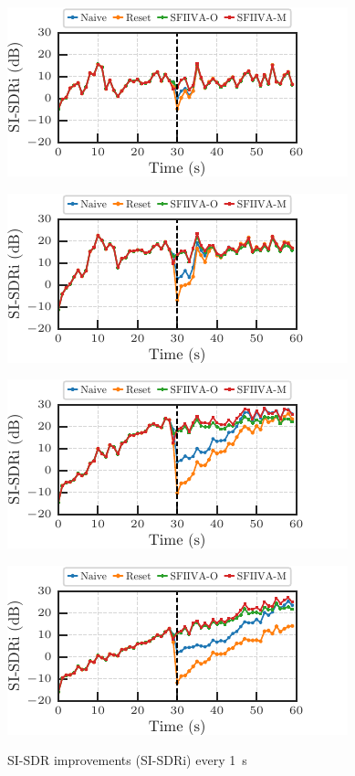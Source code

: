 \documentclass[sip,biber]{now-journal}
\begin{document}
\begin{figure}[t]
  \centering
  \begin{minipage}[t]{.45\textwidth}
    \centering\includegraphics{figures/plots/online/line_900.pdf}\label{fig:plot:line:900}
  \end{minipage}
  \begin{minipage}[t]{.45\textwidth}
    \centering\includegraphics{figures/plots/online/line_950.pdf}\label{fig:plot:line:950}
  \end{minipage}

  \begin{minipage}[t]{.45\textwidth}
    \centering\includegraphics{figures/plots/online/line_980.pdf}\label{fig:plot:line:980}
  \end{minipage}
  \begin{minipage}[t]{.45\textwidth}
    \centering\includegraphics{figures/plots/online/line_990.pdf}\label{fig:plot:line:990}
  \end{minipage}
  \caption{SI-SDR improvements (SI-SDRi) every \SI{1}{\second}}%
  \label{fig:plot:line}
\end{figure}
\end{document}
